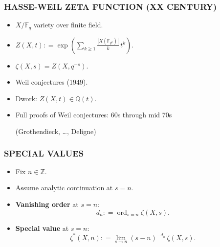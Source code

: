 \documentclass[handout]{beamer}
\newcommand{\FF}{\mathbb{F}}
\newcommand{\QQ}{\mathbb{Q}}
\newcommand{\ZZ}{\mathbb{Z}}
\newcommand{\dfn}{\mathrel{\mathop:}=}
\DeclareMathOperator{\ord}{ord}
\begin{document}

\begin{frame}
  \frametitle{HASSE-WEIL ZETA FUNCTION (XX CENTURY)}

  \begin{itemize}
  \item<2-> $X/\FF_q$ variety over finite field.

  \item<3-> $Z (X,t) \dfn \exp \left(\sum_{k\ge 1} \frac{|X (\FF_{q^k})|}{k}\,t^k\right)$.

  \item<4-> $\zeta (X,s) = Z (X,q^{-s})$.

  \item<5-> Weil conjectures (1949).

  \item<6-> Dwork: $Z (X,t) \in \QQ (t)$.

  \item<7-> Full proofs of Weil conjectures: 60s through mid 70s

    (Grothendieck, \dots, Deligne)
  \end{itemize}
\end{frame}


\begin{frame}
  \frametitle{SPECIAL VALUES}

  \begin{itemize}
  \item<2-> Fix $n \in \ZZ$.

  \item<3-> Assume analytic continuation at $s = n$.

  \item<4-> \textbf{Vanishing order} at $s = n$:
    \[ d_n \dfn \ord_{s=n} \zeta (X,s). \]

  \item<5-> \textbf{Special value} at $s = n$:
    \[ \zeta^* (X,n) \dfn \lim_{s \to n} (s-n)^{-d_n}\,\zeta (X,s). \]
  \end{itemize}
\end{frame}

\end{document}
